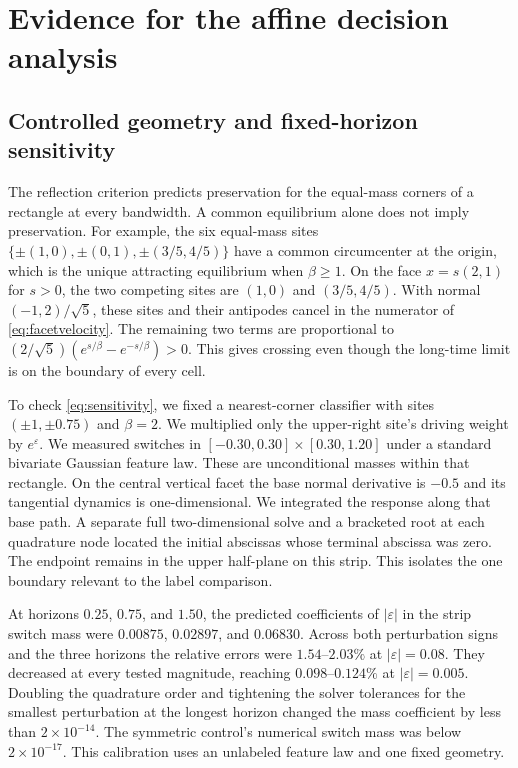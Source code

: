 \section{Evidence for the affine decision analysis}
\label{sec:flat-evidence}

\subsection{Controlled geometry and fixed-horizon sensitivity}

The reflection criterion predicts preservation for the equal-mass
corners of a rectangle at every bandwidth. A common equilibrium alone
does not imply preservation. For example, the six equal-mass sites
$\{\pm(1,0),\pm(0,1),\pm(3/5,4/5)\}$ have a common circumcenter at
the origin, which is the unique attracting equilibrium when
$\beta\ge1$. On the face $x=s(2,1)$ for $s>0$, the two competing
sites are $(1,0)$ and $(3/5,4/5)$. With normal $(-1,2)/\sqrt5$,
these sites and their antipodes cancel in the numerator of
\eqref{eq:facetvelocity}. The remaining two terms are proportional
to $(2/\sqrt5)(e^{s/\beta}-e^{-s/\beta})>0$. This gives crossing
even though the long-time limit is on the boundary of every cell.

To check \eqref{eq:sensitivity}, we fixed a nearest-corner classifier
with sites $(\pm1,\pm0.75)$ and $\beta=2$. We multiplied only the
upper-right site's driving weight by $e^\varepsilon$. We measured
switches in $[-0.30,0.30]\times[0.30,1.20]$ under a standard
bivariate Gaussian feature law. These are unconditional masses
within that rectangle. On the central vertical facet the base normal
derivative is $-0.5$ and its tangential dynamics is one-dimensional.
We integrated the response along that base path. A separate full
two-dimensional solve and a bracketed root at each quadrature node
located the initial abscissas whose terminal abscissa was zero.
The endpoint remains in the upper half-plane on this strip.
This isolates the one boundary relevant to the label comparison.

At horizons $0.25$, $0.75$, and $1.50$, the predicted coefficients
of $|\varepsilon|$ in the strip switch mass were $0.00875$,
$0.02897$, and $0.06830$. Across both perturbation signs and the three
horizons the relative errors were $1.54$--$2.03\%$ at
$|\varepsilon|=0.08$. They decreased at every tested magnitude,
reaching $0.098$--$0.124\%$ at $|\varepsilon|=0.005$.
Doubling the quadrature order and tightening the solver tolerances
for the smallest perturbation at the longest horizon changed
the mass coefficient by less than $2\times10^{-14}$. The symmetric
control's numerical switch mass was below $2\times10^{-17}$.
This calibration uses an unlabeled feature law and one fixed geometry.

